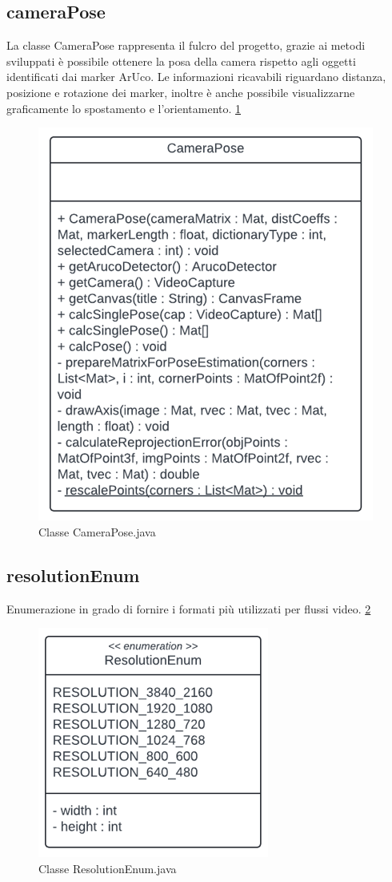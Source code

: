 \documentclass[12pt,a4paper,openright,twoside]{book}
\begin{document}
\subsection{cameraPose}
La classe CameraPose rappresenta il fulcro del progetto, grazie ai metodi sviluppati è possibile ottenere la posa della camera rispetto agli oggetti identificati dai marker ArUco. Le informazioni ricavabili riguardano distanza, posizione e rotazione dei marker, inoltre è anche possibile visualizzarne graficamente lo spostamento e l'orientamento. \ref{fig:camera_pose}
\begin{figure}
	\centering
	\includegraphics[width=0.5\linewidth]{./figures/UML/cameraPose.png}
	\caption{Classe CameraPose.java}
	\label{fig:camera_pose}
\end{figure}
\subsection{resolutionEnum}
Enumerazione in grado di fornire i formati più utilizzati per flussi video. \ref{fig:resolution_enum}
\begin{figure}
	\centering
	\includegraphics[width=0.5\linewidth]{./figures/UML/resolutionEnum.png}
	\caption{Classe ResolutionEnum.java}
	\label{fig:resolution_enum}
\end{figure}
\end{document}

